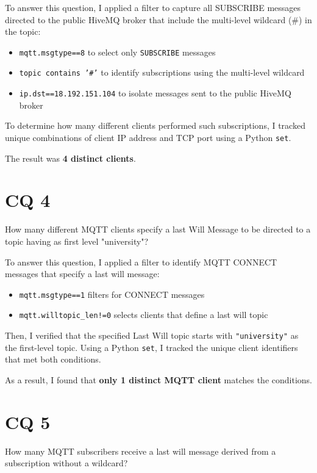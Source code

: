 \documentclass{Configuration_Files/PoliMi3i_thesis}
\begin{document}
To answer this question, I applied a filter to capture all SUBSCRIBE messages directed to the public HiveMQ broker that include the multi-level wildcard (\#) in the topic:
\begin{itemize}
    \item \texttt{mqtt.msgtype==8} to select only \texttt{SUBSCRIBE} messages
    \item \texttt{topic contains '\#'} to identify subscriptions using the multi-level wildcard
    \item \texttt{ip.dst==18.192.151.104} to isolate messages sent to the public HiveMQ broker
\end{itemize}

To determine how many different clients performed such subscriptions, I tracked unique combinations of client IP address and TCP port using a Python \texttt{set}.

The result was \textbf{4 distinct clients}.



\chapter{CQ 4}
\begin{tcolorbox}[questionbox]
    How many different MQTT clients specify a last Will Message to be directed to a topic having as first level "university"?
\end{tcolorbox}

To answer this question, I applied a filter to identify MQTT CONNECT messages that specify a last will message:
\begin{itemize}
  \item \texttt{mqtt.msgtype==1} filters for CONNECT messages
  \item \texttt{mqtt.willtopic\_len!=0} selects clients that define a last will topic
\end{itemize}

Then, I verified that the specified Last Will topic starts with \texttt{"university"} as the first-level topic.  
Using a Python \texttt{set}, I tracked the unique client identifiers that met both conditions.

As a result, I found that \textbf{only 1 distinct MQTT client} matches the conditions.



\chapter{CQ 5}
\begin{tcolorbox}[questionbox]
    How many MQTT subscribers receive a last will message derived from a subscription without a wildcard?
\end{tcolorbox}
\end{document}
